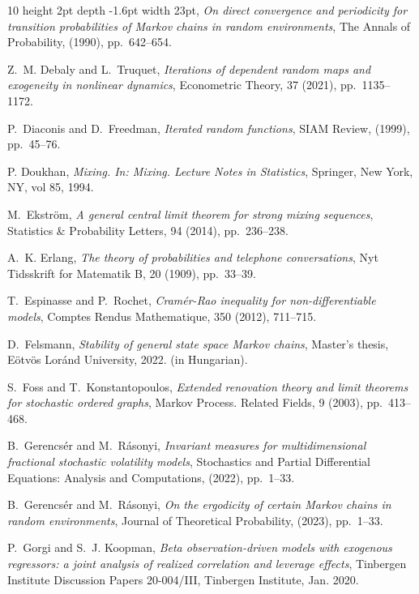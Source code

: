 \documentclass[a4paper,10pt]{article}
\begin{document}
\begin{thebibliography}{10}
	\leavevmode\vrule height 2pt depth -1.6pt width 23pt, {\em On direct convergence and periodicity for transition probabilities of Markov chains in random environments}, The Annals of Probability,  (1990), pp.~642--654.
	
	{\sc Z.~M. Debaly and L.~Truquet}, {\em Iterations of dependent random maps and
		exogeneity in nonlinear dynamics}, Econometric Theory, 37 (2021),
	pp.~1135--1172.
	
	{\sc P.~Diaconis and D.~Freedman}, {\em Iterated random functions},
	{S}{I}{A}{M} Review,  (1999), pp.~45--76.
	
	{\sc P. Doukhan}, {\em Mixing. In: Mixing. Lecture Notes in Statistics}, Springer, New York, NY, vol 85, 1994.
	
	{\sc M.~Ekstr{\"o}m}, {\em A general central limit theorem for strong mixing
		sequences}, Statistics \& Probability Letters, 94 (2014), pp.~236--238.
	
	{\sc A.~K. Erlang}, {\em The theory of probabilities and telephone conversations}, Nyt Tidsskrift for Matematik B, 20 (1909), pp.~33--39.
			
	{\sc T.~Espinasse and P.~Rochet}, {\em Cram\'er-Rao inequality for non-differentiable models}, Comptes Rendus Mathematique, 350 (2012), 711--715.
	
	{\sc D.~Felsmann}, {\em Stability of general state space {M}arkov chains},
	Master's thesis, {E\"otv\"os Lor\'and University}, 2022.
	\newblock (in {H}ungarian).
	
	{\sc S.~Foss and T.~Konstantopoulos}, {\em Extended renovation theory and limit
		theorems for stochastic ordered graphs}, Markov Process. Related Fields, 9
	(2003), pp.~413--468.
	
	{\sc B.~Gerencs{\'e}r and M.~R{\'a}sonyi}, {\em Invariant measures for
		multidimensional fractional stochastic volatility models}, Stochastics and
	Partial Differential Equations: Analysis and Computations,  (2022),
	pp.~1--33.
	
	{\sc B.~Gerencs{\'e}r and M.~R{\'a}sonyi}, {\em On the ergodicity of certain
		{M}arkov chains in random environments}, Journal of Theoretical Probability,
	(2023), pp.~1--33.
	
	{\sc P.~Gorgi and S.~J. Koopman}, {\em {Beta observation-driven models with
			exogenous regressors: a joint analysis of realized correlation and leverage
			effects}}, Tinbergen Institute Discussion Papers 20-004/III, Tinbergen
	Institute, Jan. 2020.
	

\end{thebibliography}
\end{document}
